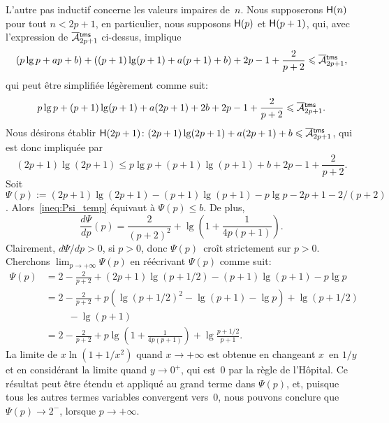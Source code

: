L'autre pas inductif concerne les valeurs impaires de~\(n\). Nous
supposerons \(\textsf{H}({n})\) pour tout \(n < 2p+1\), en particulier,
nous supposons \(\textsf{H}({p})\) et \(\textsf{H}({p+1})\), qui, avec
l'expression de \(\OM{\fun{tms}}{2p+1}\) ci-dessus, implique
\begin{equation*}
(p\lg p + ap + b) + ((p+1)\lg(p+1) + a(p+1) + b) + 2p - 1 +
\frac{2}{p+2} \leqslant \OM{\fun{tms}}{2p+1},
\end{equation*}
qui peut être simplifiée légèrement comme suit:
\begin{equation*}
p\lg p + (p+1)\lg(p+1) + a(2p+1) + 2b + 2p - 1 + \frac{2}{p+2}
\leqslant \OM{\fun{tms}}{2p+1}.
\end{equation*}
Nous désirons établir \(\pred{H}{2p+1} \colon (2p+1)\lg(2p+1) +
a(2p+1) + b \leqslant \OM{\fun{tms}}{2p+1}\), qui est donc impliquée
par
\begin{equation}
  (2p+1)\lg(2p+1) \leqslant
  p\lg p + (p+1)\lg(p+1) + b + 2p - 1 + \frac{2}{p+2}.
  \label{ineq:Psi_temp}
\end{equation}
Soit \(\Psi(p) := (2p+1)\lg(2p+1) - (p+1)\lg(p+1) - p\lg p - 2p + 1 -
2/(p+2)\). Alors~\eqref{ineq:Psi_temp} équivaut à \(\Psi(p) \leqslant
b\). De plus,
\begin{equation*}
\frac{d\Psi}{dp}(p) = \frac{2}{(p+2)^2} + \lg\left(1+\frac{1}{4p(p+1)}\right).
\end{equation*}
Clairement, \(d\Psi/dp > 0\), si \(p > 0\), donc \(\Psi(p)\)~croît
strictement sur \(p > 0\). Cherchons \(\lim_{p \to +\infty}\Psi(p)\)
en réécrivant \(\Psi(p)\) comme suit:
\begin{align*}
\Psi(p)
  &= 2 - \frac{2}{p+2} + (2p+1)\lg(p+1/2) - (p+1)\lg(p+1)
     - p\lg p\\
  &= 2 - \frac{2}{p+2} + p\left(\lg(p+1/2)^2 - \lg(p+1)
   - \lg p\right) + \lg(p+1/2)\\
  &\phantom{=} \quad - \lg(p+1)\\
  &= 2 - \frac{2}{p+2} + p\lg\left(1 + \frac{1}{4p(p+1)}\right) +
  \lg\frac{p + 1/2}{p+1}.
\end{align*}
La limite de \(x\ln(1+1/x^2)\) quand \(x \to +\infty\) est obtenue en
changeant \(x\)~en \(1/y\) et en considérant la limite quand \(y \to
0^{+}\), qui est~\(0\) par la règle de l'Hôpital. Ce résultat peut
être étendu et appliqué au grand terme dans \(\Psi(p)\), et, puisque
tous les autres termes variables convergent vers~\(0\), nous pouvons
conclure que \(\Psi(p) \to 2^{-}\), lorsque \(p \to +\infty\).

